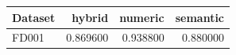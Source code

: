 \begin{tabular}{lrrr}
\toprule
Dataset & hybrid & numeric & semantic \\
\midrule
FD001 & 0.869600 & 0.938800 & 0.880000 \\
\bottomrule
\end{tabular}
